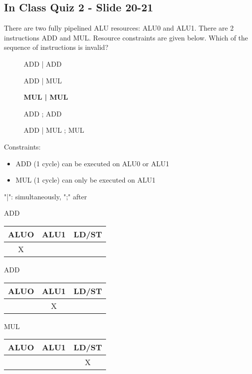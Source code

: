 \documentclass{report}
\newcommand{\cmark}{\ding{51}}%
\newcommand{\xmark}{\ding{55}}%
\begin{document}
\subsection{In Class Quiz 2 - Slide 20-21}
There are two fully pipelined ALU resources: ALU0 and ALU1. There are 2 instructions ADD and MUL. Resource constraints are given below. Which of the sequence of instructions is invalid?
\vspace{-1em}
\begin{multicols}{2}
  \begin{description}
    \item [\cmark] ADD | ADD
    \item [\cmark] ADD | MUL
    \item [\xmark] \textbf{MUL | MUL}
    \item [\cmark] ADD ; ADD
    \item [\cmark] ADD | MUL ; MUL
  \end{description}
  \setlength{\leftskip}{-8em}
  Constraints:
  \begin{itemize}
  \setlength{\leftskip}{-8em}
    \item ADD (1 cycle) can be executed on ALU0 or ALU1
    \item MUL (1 cycle) can only be executed on ALU1
  \end{itemize}
  "|": simultaneously, ";" after
\end{multicols}
\vspace{-2em}
\begin{multicols}{3}
ADD \\
\begin{tabular}{|c|c|c|}
  \hline
  ALUO & ALU1 & LD/ST \\
  \hline
  X    &      &       \\
  \hline
\end{tabular}
  \vfill\columnbreak
ADD \\
\begin{tabular}{|c|c|c|}
  \hline
  ALUO & ALU1 & LD/ST \\
  \hline
       & X    &       \\
  \hline
\end{tabular}
  \vfill\columnbreak
MUL \\
\begin{tabular}{|c|c|c|}
  \hline
  ALUO & ALU1 & LD/ST \\
  \hline
       &      & X     \\
  \hline
\end{tabular}
\end{multicols}
\end{document}
